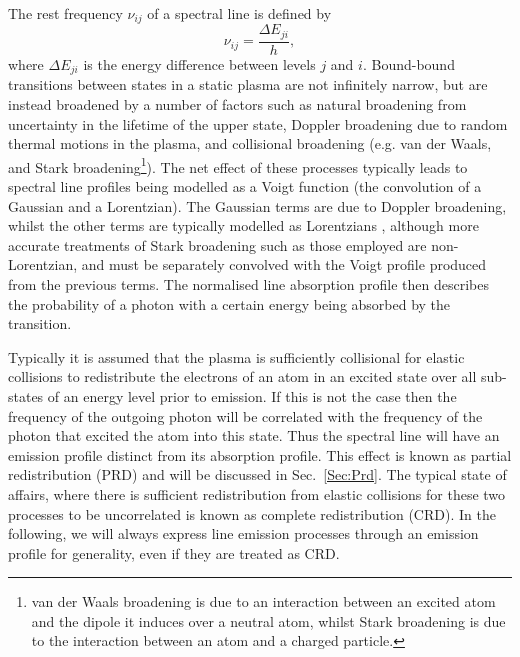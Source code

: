 The rest frequency $\nu_{ij}$ of a spectral line is defined by
\begin{equation}
    \nu_{ij} = \frac{\Delta E_{ji}}{h},
\end{equation}
where $\Delta E_{ji}$ is the energy difference between levels $j$ and $i$.
Bound-bound transitions between states in a static plasma are not infinitely narrow, but are instead broadened by a number of factors such as natural broadening from uncertainty in the lifetime of the upper state, Doppler broadening due to random thermal motions in the plasma, and collisional broadening (e.g. van der Waals, and Stark broadening\footnote{van der Waals broadening is due to an interaction between an excited atom and the dipole it induces over a neutral atom, whilst Stark broadening is due to the interaction between an atom and a charged particle.}). %
The net effect of these processes typically leads to spectral line profiles being modelled as a Voigt function (the convolution of a Gaussian and a Lorentzian).
The Gaussian terms are due to Doppler broadening, whilst the other terms are typically modelled as Lorentzians \citep[e.g.][]{Sutton1978}, although more accurate treatments of Stark broadening such as those employed \citet{Kowalski2017} are non-Lorentzian, and must be separately convolved with the Voigt profile produced from the previous terms.
The normalised line absorption profile then describes the probability of a photon with a certain energy being absorbed by the transition.

Typically it is assumed that the plasma is sufficiently collisional for elastic collisions to redistribute the electrons of an atom in an excited state over all sub-states of an energy level prior to emission.
If this is not the case then the frequency of the outgoing photon will be correlated with the frequency of the photon that excited the atom into this state.
Thus the spectral line will have an emission profile distinct from its absorption profile.
This effect is known as partial  redistribution (PRD) and will be discussed in Sec.~\ref{Sec:Prd}.
The typical state of affairs, where there is sufficient redistribution from elastic collisions for these two processes to be uncorrelated is known as complete redistribution (CRD).
In the following, we will always express line emission processes through an emission profile for generality, even if they are treated as CRD.

